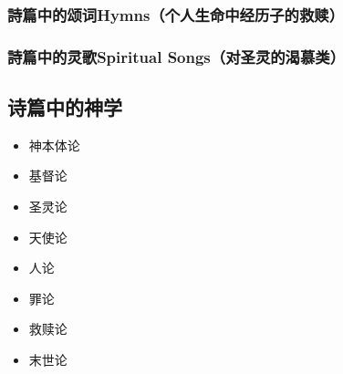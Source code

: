 \subsubsection{詩篇中的颂词Hymns（个人生命中经历子的救赎）}

\subsubsection{詩篇中的灵歌Spiritual Songs（对圣灵的渴慕类）}

\subsection{诗篇中的神学}
\begin{itemize}
\itemsep-.45em  
\item 神本体论
\item 基督论
\item 圣灵论
\item 天使论
\item 人论
\item 罪论
\item 救赎论
\item 末世论
\end{itemize}

